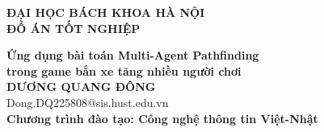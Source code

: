 \documentclass[DoAn.tex]{subfiles}
\begin{document}
\begin{titlepage}
\thispagestyle{empty}
\begin{center}

{\textbf{\large{ĐẠI HỌC BÁCH KHOA HÀ NỘI}}}\\[2.5cm]

{\textbf{\huge{ ĐỒ ÁN TỐT NGHIỆP}}}\\[1cm]
{\textbf{\Large{Ứng dụng bài toán Multi-Agent Pathfinding\\[0.3cm]
trong game bắn xe tăng nhiều người chơi}}\\[1cm]

{\textbf{\large{DƯƠNG QUANG ĐÔNG}}}\\
{\large{Dong.DQ225808@sis.hust.edu.vn}}\\[0.5cm]

{\textbf{\large{Chương trình đào tạo: Công nghệ thông tin Việt-Nhật
}}}\\

\vspace{2cm}
\begin{table}[H]
\centering
{}
\end{table}}
\end{center}



\end{titlepage}
\end{document}
